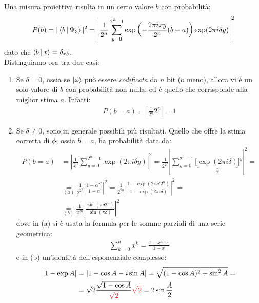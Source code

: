 \documentclass[../../InformazioneQuantistica.tex]{subfiles}
\begin{document}
Una misura proiettiva risulta in un certo valore $b$ con probabilità:
\begin{align*}
   P(b) = |\Braket{b|\Psi_3}|^2 = \left| \frac{1}{2^n} \sum_{y=0}^{2^n-1} \exp\left(-\frac{2\pi i xy}{2^n} (b-a) \right) \exp(2\pi i \delta y ) \right|^2
\end{align*}
dato che $\Braket{b|x} = \delta_{xb}$.\\
Distinguiamo ora tra due casi:
\begin{enumerate}
    \item Se $\delta = 0$, ossia se $\Ket{\phi}$ può essere \textit{codificata} da $n$ bit (o meno), allora vi è un solo valore di $b$ con probabilità non nulla, ed è quello che corrisponde alla miglior stima $a$. Infatti:
    \begin{align*}
        P(b=a) = \left| \frac{1}{2^n} 2^n \right| = 1
    \end{align*}
    \item Se $\delta \neq 0$, sono in generale possibili più risultati. Quello che offre la stima corretta di $\phi$, ossia $b=a$, ha probabilità data da:
    \begin{align} \nonumber
        P(b=a) &= \left|\frac{1}{2^n} \sum_{y=0}^{2^n-1} \exp(2\pi i \delta y ) \right|^2 = \frac{1}{2^{2^n}} \left| \sum_{y=0}^{2^n-1} \big[\underbrace{\exp(2\pi i \delta)}_\alpha\big]^y \right |^2 =\\ \nonumber
        &\underset{(a)}{=} \frac{1}{2^{2^n}} \left| \frac{1-\alpha^{2^n}}{1-\alpha} \right|^2 = \frac{1}{2^{2n}} \left| \frac{1-\exp(2\pi i \delta 2^n)}{1-\exp(2\pi i \delta )}\right|^2 = \\
        &\underset{(b)}{=} \frac{1}{2^{2n}} \left| \frac{\sin(\pi \delta 2^n)}{\sin(\pi\delta)} \right|^2
        \label{eqn:Pba-deltaneq0}
    \end{align}
    dove in (a) si è usata la formula per le somme parziali di una serie geometrica:
    \begin{align*}
        \sum_{k=0}^n x^k = \frac{1-x^{n+1}}{1-x}
    \end{align*}
    e in (b) un'identità dell'esponenziale complesso:
    \begin{align*}
        |1-\exp A | &= |1-\cos A -i \sin A| = \sqrt{(1-\cos A)^2 + \sin^2 A} =\\
        &=\sqrt{2} \frac{\sqrt{1-\cos A}}{\textcolor{Red}{\sqrt{2}}}\textcolor{Red}{\sqrt{2}} = 2\sin \frac{A}{2}
    \end{align*}
    

\end{enumerate}
\end{document}
